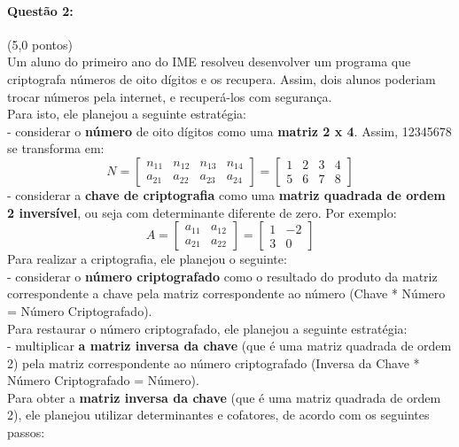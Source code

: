 \documentclass[12pt,a4paper]{article}
\begin{document}
\paragraph{Questão 2:}(5,0 pontos)\\
Um aluno do primeiro ano do IME resolveu desenvolver um programa que criptografa números de oito dígitos e os recupera. Assim, dois alunos poderiam trocar números pela internet, e recuperá-los com segurança.\\
 Para isto, ele planejou a seguinte estratégia: \\
- considerar o \textbf{número} de oito dígitos como uma \textbf{matriz 2 x 4}. Assim, 12345678 se transforma em:
$$N
=
\begin{bmatrix}
n_{11} & n_{12} & n_{13} &n_{14} \\ 
a_{21} & a_{22} & a_{23} & a_{24}
\end{bmatrix}
=
\begin{bmatrix}
1 & 2 & 3 & 4\\ 
5 & 6 & 7 & 8
\end{bmatrix}$$
- considerar a \textbf{chave de criptografia} como uma \textbf{matriz quadrada de ordem 2 inversível}, ou seja com determinante diferente de zero. Por exemplo:
$$A=
\begin{bmatrix}
a_{11} &a_{12} \\ 
a_{21} & a_{22}
\end{bmatrix}
=
\begin{bmatrix}
1 & -2\\ 
3 & 0
\end{bmatrix}$$
Para realizar a criptografia, ele planejou o seguinte:\\
 - considerar o \textbf{número criptografado} como o resultado do produto da matriz correspondente a chave pela matriz correspondente ao número (Chave * Número = Número Criptografado).\\
Para restaurar o número criptografado, ele planejou a seguinte estratégia:\\
- multiplicar \textbf{a matriz inversa da chave} (que é uma matriz quadrada de ordem 2) pela matriz correspondente ao número criptografado (Inversa da Chave * Número Criptografado = Número).\\
Para obter a \textbf{matriz inversa da chave} (que é uma matriz quadrada de ordem 2), ele planejou utilizar determinantes e cofatores, de acordo com os seguintes passos:
\end{document}
